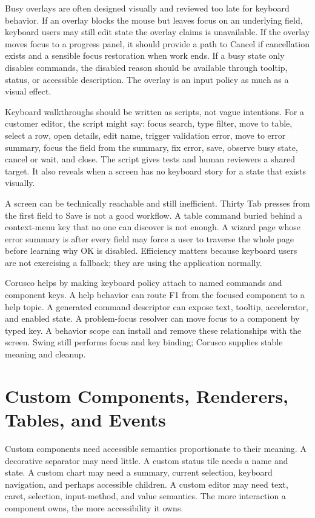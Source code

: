 Busy overlays are often designed visually and reviewed too late for keyboard
behavior. If an overlay blocks the mouse but leaves focus on an underlying
field, keyboard users may still edit state the overlay claims is unavailable.
If the overlay moves focus to a progress panel, it should provide a path to
Cancel if cancellation exists and a sensible focus restoration when work ends.
If a busy state only disables commands, the disabled reason should be available
through tooltip, status, or accessible description. The overlay is an input
policy as much as a visual effect.

Keyboard walkthroughs should be written as scripts, not vague intentions. For a
customer editor, the script might say: focus search, type filter, move to table,
select a row, open details, edit name, trigger validation error, move to error
summary, focus the field from the summary, fix error, save, observe busy state,
cancel or wait, and close. The script gives tests and human reviewers a shared
target. It also reveals when a screen has no keyboard story for a state that
exists visually.

A screen can be technically reachable and still inefficient. Thirty Tab presses
from the first field to Save is not a good workflow. A table command buried
behind a context-menu key that no one can discover is not enough. A wizard page
whose error summary is after every field may force a user to traverse the whole
page before learning why OK is disabled. Efficiency matters because keyboard
users are not exercising a fallback; they are using the application normally.

Corusco helps by making keyboard policy attach to named commands and component
keys. A help behavior can route F1 from the focused component to a help topic.
A generated command descriptor can expose text, tooltip, accelerator, and
enabled state. A problem-focus resolver can move focus to a component by typed
key. A behavior scope can install and remove these relationships with the
screen. Swing still performs focus and key binding; Corusco supplies stable
meaning and cleanup.

\section{Custom Components, Renderers, Tables, and Events}

Custom components need accessible semantics proportionate to their meaning. A decorative separator may need little. A custom status tile needs a name and state. A custom chart may need a summary, current selection, keyboard navigation, and perhaps accessible children. A custom editor may need text, caret, selection, input-method, and value semantics. The more interaction a component owns, the more accessibility it owns.

